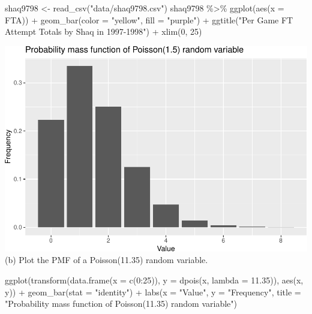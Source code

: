\documentclass[
  11pt,
]{book}
\newenvironment{Shaded}{\begin{snugshade}}{\end{snugshade}}
\newcommand{\AttributeTok}[1]{\textcolor[rgb]{0.77,0.63,0.00}{#1}}
\newcommand{\DecValTok}[1]{\textcolor[rgb]{0.00,0.00,0.81}{#1}}
\newcommand{\FloatTok}[1]{\textcolor[rgb]{0.00,0.00,0.81}{#1}}
\newcommand{\FunctionTok}[1]{\textcolor[rgb]{0.00,0.00,0.00}{#1}}
\newcommand{\NormalTok}[1]{#1}
\newcommand{\OtherTok}[1]{\textcolor[rgb]{0.56,0.35,0.01}{#1}}
\newcommand{\SpecialCharTok}[1]{\textcolor[rgb]{0.00,0.00,0.00}{#1}}
\newcommand{\StringTok}[1]{\textcolor[rgb]{0.31,0.60,0.02}{#1}}
\theoremstyle{definition}
\theoremstyle{definition}
\theoremstyle{definition}
\theoremstyle{definition}
\theoremstyle{remark}
\begin{document}
\begin{Shaded}
\begin{Highlighting}[]
\NormalTok{shaq9798 }\OtherTok{\textless{}{-}} \FunctionTok{read\_csv}\NormalTok{(}\StringTok{"data/shaq9798.csv"}\NormalTok{)}
\NormalTok{shaq9798 }\SpecialCharTok{\%\textgreater{}\%}
    \FunctionTok{ggplot}\NormalTok{(}\FunctionTok{aes}\NormalTok{(}\AttributeTok{x =}\NormalTok{ FTA)) }\SpecialCharTok{+} \FunctionTok{geom\_bar}\NormalTok{(}\AttributeTok{color =} \StringTok{"yellow"}\NormalTok{, }\AttributeTok{fill =} \StringTok{"purple"}\NormalTok{) }\SpecialCharTok{+} \FunctionTok{ggtitle}\NormalTok{(}\StringTok{"Per Game FT Attempt Totals by Shaq in 1997{-}1998"}\NormalTok{) }\SpecialCharTok{+}
    \FunctionTok{xlim}\NormalTok{(}\DecValTok{0}\NormalTok{, }\DecValTok{25}\NormalTok{)}
\end{Highlighting}
\end{Shaded}

\includegraphics{series_files/figure-latex/unnamed-chunk-54-1.pdf}
(b) Plot the PMF of a Poisson(11.35) random variable.

\begin{Shaded}
\begin{Highlighting}[]
\FunctionTok{ggplot}\NormalTok{(}\FunctionTok{transform}\NormalTok{(}\FunctionTok{data.frame}\NormalTok{(}\AttributeTok{x =} \FunctionTok{c}\NormalTok{(}\DecValTok{0}\SpecialCharTok{:}\DecValTok{25}\NormalTok{)), }\AttributeTok{y =} \FunctionTok{dpois}\NormalTok{(x, }\AttributeTok{lambda =} \FloatTok{11.35}\NormalTok{)), }\FunctionTok{aes}\NormalTok{(x, y)) }\SpecialCharTok{+}
    \FunctionTok{geom\_bar}\NormalTok{(}\AttributeTok{stat =} \StringTok{"identity"}\NormalTok{) }\SpecialCharTok{+} \FunctionTok{labs}\NormalTok{(}\AttributeTok{x =} \StringTok{"Value"}\NormalTok{, }\AttributeTok{y =} \StringTok{"Frequency"}\NormalTok{, }\AttributeTok{title =} \StringTok{"Probability mass function of Poisson(11.35) random variable"}\NormalTok{)}
\end{Highlighting}
\end{Shaded}
\end{document}
